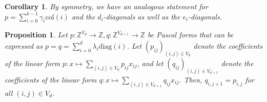 \documentclass[11pt]{article}
\newtheorem{proposition}[theorem]{Proposition}
\newtheorem{corollary}[theorem]{Corollary}
\begin{document}
\begin{corollary}
  By symmetry, we have an analogous statement for $p = \sum_{i=0}^{k-1} \gamma_{i} \mathrm{col}(i)$ and the $d_{i}$-diagonals as well as the $e_{i}$-diagonals.
\end{corollary}

\begin{proposition}\label{prop:col_diag_extend_d}
  Let \( p : \mathbb{Z}^{V_d} \to \mathbb{Z},  q: \mathbb{Z}^{V_{d+1}} \to \mathbb{Z}  \) be Pascal forms that can be expressed as \( p = q = \sum_{i=0}^{d}  \lambda_{i} \mathrm{diag}(i) \). Let \( (p_{ij})_{(i,j) \in V_d} \) denote the coefficients of the linear form \( p: x \mapsto \sum_{(i,j) \in V_d} p_{ij}x_{ij} \), and let \( (q_{ij})_{(i,j) \in V_{d+1}} \) denote the coefficients of the linear form \( q: x \mapsto \sum_{(i,j) \in V_{d+1}} q_{ij}x_{ij} \). Then, \( q_{i,j+1} = p_{i,j} \) for all \( (i,j) \in V_d \).
  

\end{proposition}
\end{document}
